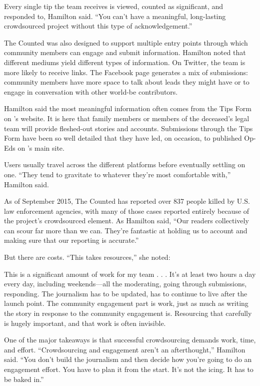 \begin{itemize}
\begin{itemize}
\begin{enumerate}
{Every single tip the team receives is viewed, counted as significant, and responded to, Hamilton said. “You can’t have a meaningful, long-lasting crowdsourced project without this type of acknowledgement.”

The Counted was also designed to support multiple entry points through which community members can engage and submit information.
Hamilton noted that different mediums yield different types of information. On Twitter, the team is more likely to receive links. The Facebook page generates a mix of submissions: community members have more space to talk about leads they might have or to engage in conversation with other world-be contributors.

Hamilton said the most meaningful information often comes from the Tips Form on ’s website. It is here that family members or members of the deceased’s legal team will provide fleshed-out stories and accounts. Submissions through the Tips Form have been so well detailed that they have led, on occasion, to published Op-Eds on ’s main site.

Users usually travel across the different platforms before eventually settling on one. “They tend to gravitate to whatever they’re most comfortable with,” Hamilton said.

As of September 2015, The Counted has reported over 837 people killed by U.S. law enforcement agencies, with many of those cases reported entirely because of the project’s crowdsourced element. As Hamilton said, “Our readers collectively can scour far more than we can. They’re fantastic at holding us to account and making sure that our reporting is accurate.” 

But there are costs. “This takes resources,” she noted: 

This is a significant amount of work for my team . . . It’s at least two hours a day every day, including weekends---all the moderating, going through submissions, responding. The journalism has to be updated, has to continue to live after the launch point. The community engagement part is work, just as much as writing the story in response to the community engagement is. Resourcing that carefully is hugely important, and that work is often invisible. 

One of the major takeaways is that successful crowdsourcing demands work, time, and effort. “Crowdsourcing and engagement aren’t an afterthought,” Hamilton said. “You don’t build the journalism and then decide how you’re going to do an engagement effort. You have to plan it from the start. It’s not the icing. It has to be baked in.” 

}
\end{enumerate}
\end{itemize}
\end{itemize}
